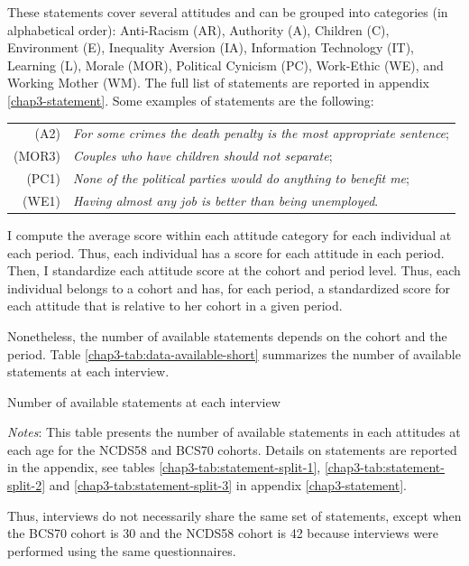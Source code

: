 These statements cover several attitudes and can be grouped into categories (in alphabetical order): Anti-Racism (AR), Authority (A), Children (C), Environment (E), Inequality Aversion (IA), Information Technology (IT), Learning (L), Morale (MOR), Political Cynicism (PC), Work-Ethic (WE), and Working Mother (WM). 
The full list of statements are reported in appendix \ref{chap3-statement}. Some examples of statements are the following:
\begin{table}[!h]
    \renewcommand*{\arraystretch}{1.5}
	\begin{tabular}{rl}
    (A2)    & \textit{For some crimes the death penalty is the most appropriate sentence};\\
    (MOR3)  & \textit{Couples who have children should not separate};\\
    (PC1)   & \textit{None of the political parties would do anything to benefit me};\\
    (WE1)   & \textit{Having almost any job is better than being unemployed}.
    \end{tabular}
\end{table}

\noindent I compute the average score within each attitude category for each individual at each period. Thus, each individual has a score for each attitude in each period. Then, I standardize each attitude score at the cohort and period level. Thus, each individual belongs to a cohort and has, for each period, a standardized score for each attitude that is relative to her cohort in a given period.

%
Nonetheless, the number of available statements depends on the cohort and the period. Table \ref{chap3-tab:data-available-short} summarizes the number of available statements at each interview.
\begin{table}[!tb]
    \centering
    \caption{Number of available statements at each interview}
    \label{chap3-tab:data-available-short}
    \begin{threeparttable}
        \setlength{\tabcolsep}{12pt}
        
        \begin{tablenotes}[flushleft]
            \footnotesize{\item \textit{Notes}: This table presents the number of available statements in each attitudes at each age for the NCDS58 and BCS70 cohorts. Details on statements are reported in the appendix, see tables \ref{chap3-tab:statement-split-1}, \ref{chap3-tab:statement-split-2} and \ref{chap3-tab:statement-split-3} in appendix \ref{chap3-statement}.}
        \end{tablenotes}
        \end{threeparttable}
\end{table}
%
Thus, interviews do not necessarily share the same set of statements, except when the BCS70 cohort is 30 and the NCDS58 cohort is 42 because interviews were performed using the same questionnaires.

